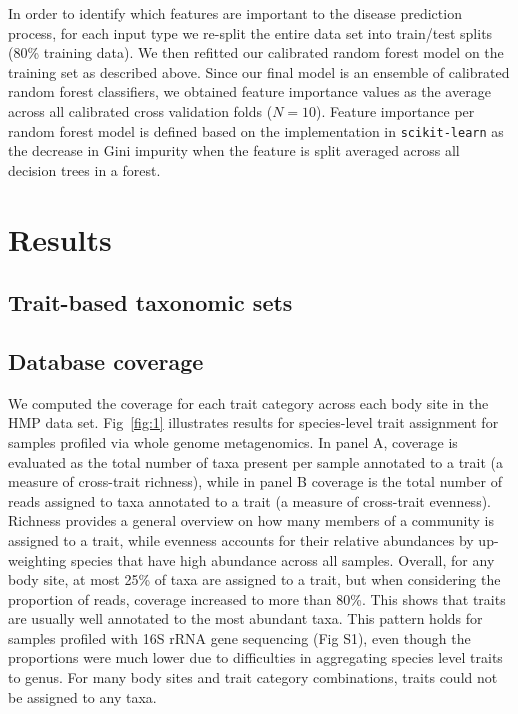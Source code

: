 \documentclass[10pt,letterpaper]{article}
\begin{document}
In order to identify which features are important to the disease prediction process, for each input type we re-split the entire data set into train/test splits (80\% training data). We then refitted our calibrated random forest model on the training set as described above. Since our final model is an ensemble of calibrated random forest classifiers, we obtained feature importance values as the average across all calibrated cross validation folds ($N = 10$). Feature importance per random forest model is defined based on the implementation in \texttt{scikit-learn} as the decrease in Gini impurity when the feature is split averaged across all decision trees in a forest. 

\section*{Results}

\subsection*{Trait-based taxonomic sets}

\subsection*{Database coverage}

We computed the coverage for each trait category across each body site in the HMP data set. Fig~\ref{fig:1} illustrates results for species-level trait assignment for samples profiled via whole genome metagenomics. In panel A, coverage is evaluated as the total number of taxa present per sample annotated to a trait (a measure of cross-trait richness), while in panel B coverage is the total number of reads assigned to taxa annotated to a trait (a measure of cross-trait evenness). Richness provides a general overview on how many members of a community is assigned to a trait, while evenness accounts for their relative abundances by up-weighting species that have high abundance across all samples. Overall, for any body site, at most 25\% of taxa are assigned to a trait, but when considering the proportion of reads, coverage increased to more than 80\%. This shows that traits are usually well annotated to the most abundant taxa.  This pattern holds for samples profiled with 16S rRNA gene sequencing (Fig S1), even though the proportions were much lower due to difficulties in aggregating species level traits to genus. For many body sites and trait category combinations, traits could not be assigned to any taxa. 
\end{document}
